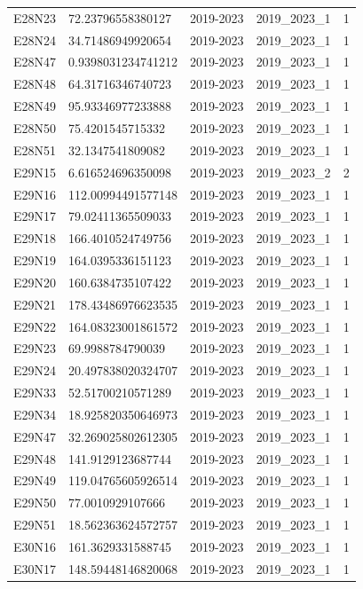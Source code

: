 \begin{landscape}
\begin{longtable}{lllll}
E28N23 & 72.23796558380127 & 2019-2023 & 2019\_2023\_1 & 1 \\
E28N24 & 34.71486949920654 & 2019-2023 & 2019\_2023\_1 & 1 \\
E28N47 & 0.9398031234741212 & 2019-2023 & 2019\_2023\_1 & 1 \\
E28N48 & 64.31716346740723 & 2019-2023 & 2019\_2023\_1 & 1 \\
E28N49 & 95.93346977233888 & 2019-2023 & 2019\_2023\_1 & 1 \\
E28N50 & 75.4201545715332 & 2019-2023 & 2019\_2023\_1 & 1 \\
E28N51 & 32.1347541809082 & 2019-2023 & 2019\_2023\_1 & 1 \\
E29N15 & 6.616524696350098 & 2019-2023 & 2019\_2023\_2 & 2 \\
E29N16 & 112.00994491577148 & 2019-2023 & 2019\_2023\_1 & 1 \\
E29N17 & 79.02411365509033 & 2019-2023 & 2019\_2023\_1 & 1 \\
E29N18 & 166.4010524749756 & 2019-2023 & 2019\_2023\_1 & 1 \\
E29N19 & 164.0395336151123 & 2019-2023 & 2019\_2023\_1 & 1 \\
E29N20 & 160.6384735107422 & 2019-2023 & 2019\_2023\_1 & 1 \\
E29N21 & 178.43486976623535 & 2019-2023 & 2019\_2023\_1 & 1 \\
E29N22 & 164.08323001861572 & 2019-2023 & 2019\_2023\_1 & 1 \\
E29N23 & 69.9988784790039 & 2019-2023 & 2019\_2023\_1 & 1 \\
E29N24 & 20.497838020324707 & 2019-2023 & 2019\_2023\_1 & 1 \\
E29N33 & 52.51700210571289 & 2019-2023 & 2019\_2023\_1 & 1 \\
E29N34 & 18.925820350646973 & 2019-2023 & 2019\_2023\_1 & 1 \\
E29N47 & 32.269025802612305 & 2019-2023 & 2019\_2023\_1 & 1 \\
E29N48 & 141.9129123687744 & 2019-2023 & 2019\_2023\_1 & 1 \\
E29N49 & 119.04765605926514 & 2019-2023 & 2019\_2023\_1 & 1 \\
E29N50 & 77.0010929107666 & 2019-2023 & 2019\_2023\_1 & 1 \\
E29N51 & 18.562363624572757 & 2019-2023 & 2019\_2023\_1 & 1 \\
E30N16 & 161.3629331588745 & 2019-2023 & 2019\_2023\_1 & 1 \\
E30N17 & 148.59448146820068 & 2019-2023 & 2019\_2023\_1 & 1 \\

\end{longtable}
\end{landscape}
